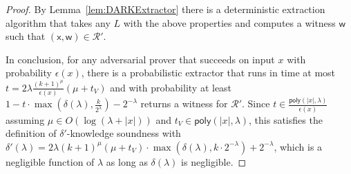 \documentclass{article}
\theoremstyle{definition}
\begin{document}
\begin{proof}
By Lemma~\ref{lem:DARKExtractor} there is a deterministic extraction algorithm that takes any $L$ with the above properties and computes a witness $\mathsf{w}$ such that $(\mathsf{x}, \mathsf{w}) \in \mathcal{R}'$. 

\medskip 

In conclusion, for any adversarial prover that succeeds on input $x$ with probability $\epsilon(x)$, there is a probabilistic extractor that runs in time at most $t = 2\lambda \frac{(k+1)^\mu}{\epsilon(x)} (\mu + t_V)$ and with probability at least $1 - t \cdot \max(\delta(\lambda), \frac{k}{2^\lambda}) - 2^{-\lambda}$ returns a witness for $\mathcal{R}'$. Since $t \in \frac{\textsf{poly}(|x|, \lambda)}{\epsilon(x)}$ assuming $\mu \in O(\log(\lambda + |x|))$ and $t_V \in \textsf{poly}(|x|, \lambda)$, this satisfies the definition of $\delta'$-knowledge soundness with $\delta'(\lambda) = 2\lambda (k+1)^\mu (\mu + t_V) \cdot \max(\delta(\lambda), k \cdot 2^{-\lambda}) + 2^{-\lambda}$, which is a negligible function of $\lambda$ as long as $\delta(\lambda)$ is negligible. 


\end{proof} 
\end{document}
